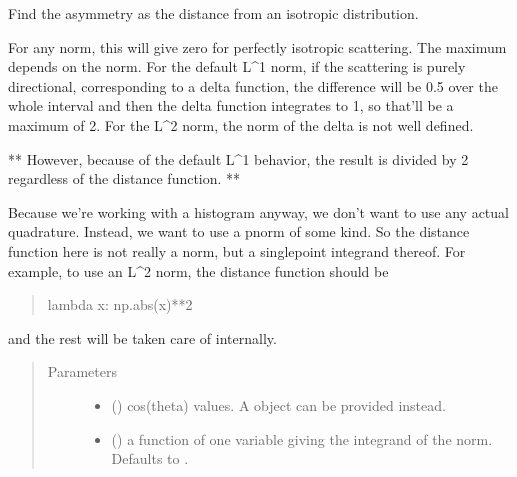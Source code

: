 \documentclass[letterpaper,10pt,english]{sphinxmanual}
\begin{document}
\begin{fulllineitems}
\label{\detokenize{analysis:scdc.analyze.norm_asymmetry}}
Find the asymmetry as the distance from an isotropic distribution.

For any norm, this will give zero for perfectly isotropic scattering. The
maximum depends on the norm. For the default L\textasciicircum{}1 norm, if the scattering is
purely directional, corresponding to a delta function, the difference will
be 0.5 over the whole interval and then the delta function integrates to 1,
so that’ll be a maximum of 2. For the L\textasciicircum{}2 norm, the norm of the delta is
not well defined.

** However, because of the default L\textasciicircum{}1 behavior, the result is divided by
2 regardless of the distance function. **

Because we’re working with a histogram anyway, we don’t want to use any
actual quadrature. Instead, we want to use a p\sphinxhyphen{}norm of some kind. So the
distance function here is not really a norm, but a single\sphinxhyphen{}point integrand
thereof. For example, to use an L\textasciicircum{}2 norm, the distance function should be
\begin{quote}

lambda x: np.abs(x)**2
\end{quote}

and the rest will be taken care of internally.
\begin{quote}\begin{description}
\item[{Parameters}] \leavevmode\begin{itemize}
\item {} 
 () \textendash{} cos(theta) values. A 
object can be provided instead.

\item {} 
 (\sphinxstyleliteralemphasis{\sphinxupquote{, }}) \textendash{} a function of one variable
giving the integrand of the norm. Defaults to .


\end{itemize}
\end{description}
\end{quote}
\end{fulllineitems}
\end{document}
